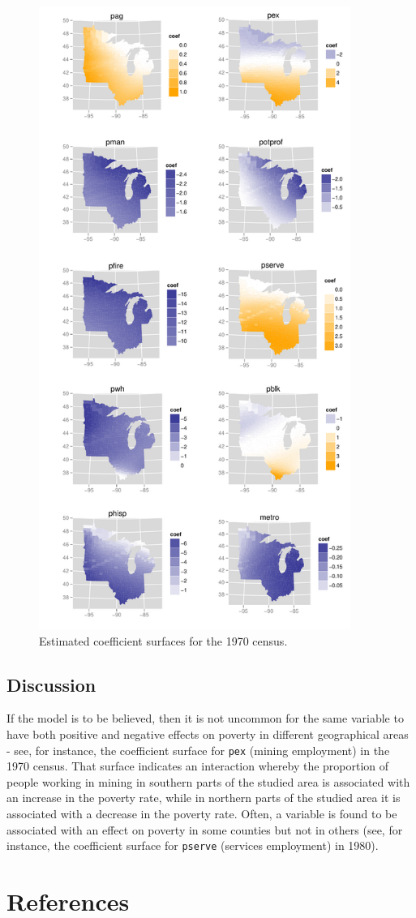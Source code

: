 \documentclass[authoryear, review, 11pt]{elsarticle}
\begin{document}
	\begin{figure}
		\begin{center}
			\includegraphics[height=8in]{../../figures/poverty/1970.linear.coefficients.pdf}
			\caption{Estimated coefficient surfaces for the 1970 census.\label{fig:census-coefs-1970}}
		\end{center}
	\end{figure}			
	\subsection{Discussion}
	If the model is to be believed, then it is not uncommon for the same variable to have both positive and negative effects on poverty in different geographical areas - see, for instance, the coefficient surface for \verb!pex! (mining employment) in the 1970 census. That surface indicates an interaction whereby the proportion of people working in mining in southern parts of the studied area is associated with an increase in the poverty rate, while in northern parts of the studied area it is associated with a decrease in the poverty rate. Often, a variable is found to be associated with an effect on poverty in some counties but not in others (see, for instance, the coefficient surface for \verb!pserve! (services employment) in 1980).

\section{References}


\end{document}
